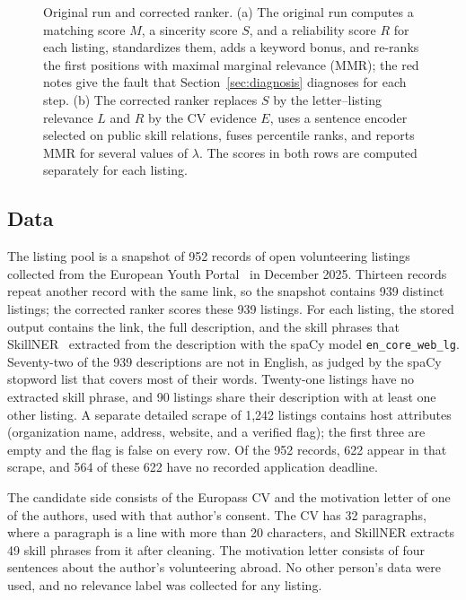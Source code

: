 \documentclass[CHICAGO]{USG}
\begin{document}
\begin{figure}[!t]
{\begin{tikzpicture}
\end{tikzpicture}}
\caption{Original run and corrected ranker. (a) The original run computes a matching score $M$, a sincerity score $S$, and a reliability score $R$ for each listing, standardizes them, adds a keyword bonus, and re-ranks the first positions with maximal marginal relevance (MMR); the red notes give the fault that Section~\ref{sec:diagnosis} diagnoses for each step. (b) The corrected ranker replaces $S$ by the letter--listing relevance $L$ and $R$ by the CV evidence $E$, uses a sentence encoder selected on public skill relations, fuses percentile ranks, and reports MMR for several values of $\lambda$. The scores in both rows are computed separately for each listing.}
\label{fig:pipeline}
\end{figure}

\subsection{Data}
\label{sec:data}
The listing pool is a snapshot of 952 records of open volunteering listings collected from the European Youth Portal~\citep{eyp} in December 2025. %
Thirteen records repeat another record with the same link, so the snapshot contains 939 distinct listings; the corrected ranker scores these 939 listings. %
For each listing, the stored output contains the link, the full description, and the skill phrases that SkillNER~\citep{skillner} extracted from the description with the spaCy model \texttt{en\_core\_web\_lg}. %
Seventy-two of the 939 descriptions are not in English, as judged by the spaCy stopword list that covers most of their words. %
Twenty-one listings have no extracted skill phrase, and 90 listings share their description with at least one other listing. %
A separate detailed scrape of 1{,}242 listings contains host attributes (organization name, address, website, and a verified flag); the first three are empty and the flag is false on every row. Of the 952 records, 622 appear in that scrape, and 564 of these 622 have no recorded application deadline. %

The candidate side consists of the Europass CV and the motivation letter of one of the authors, used with that author's consent. The CV has 32 paragraphs, where a paragraph is a line with more than 20 characters, and SkillNER extracts 49 skill phrases from it after cleaning. %
The motivation letter consists of four sentences about the author's volunteering abroad. %
No other person's data were used, and no relevance label was collected for any listing.
\end{document}
